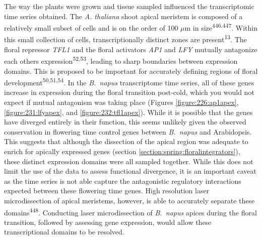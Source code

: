 \documentclass[12pt,]{book}
\begin{document}
The way the plants were grown and tissue sampled influenced the
transcriptomic time series obtained. The \emph{A. thaliana} shoot apical
meristem is composed of a relatively small subset of cells and is on the
order of 100 \(\mu\)m in size\textsuperscript{446,447}. Within this
small collection of cells, transcriptionally distinct zones are
present\textsuperscript{13}. The floral repressor \emph{TFL1} and the
floral activators \emph{AP1} and \emph{LFY} mutually antagonize each
others expression\textsuperscript{52,53}, leading to sharp boundaries
between expression domains. This is proposed to be important for
accurately defining regions of floral
development\textsuperscript{50,51,54}. In the \emph{B.~napus}
transcriptome time series, all of these genes increase in expression
during the floral transition post-cold, which you would not expect if
mutual antagonism was taking place (Figures \ref{figure:226:ap1apex},
\ref{figure:231:lfyapex}, and \ref{figure:232:tfl1apex}). While it is
possible that the genes have diverged entirely in their function, this
seems unlikely given the observed conservation in flowering time control
genes between \emph{B.~napus} and Arabidopsis. This suggests that
although the dissection of the apical region was adequate to enrich for
apically expressed genes (section
\ref{section:spring:floralintegrators}), these distinct expression
domains were all sampled together. While this does not limit the use of
the data to assess functional divergence, it is an important caveat as
the time series is not able capture the antagonistic regulatory
interactions expected between these flowering time genes. High
resolution laser microdissection of apical meristems, however, is able
to accurately separate these domains\textsuperscript{448}. Conducting
laser microdissection of \emph{B.~napus} apices during the floral
transition, followed by assessing gene expression, would allow these
transcriptional domains to be resolved.
\end{document}
